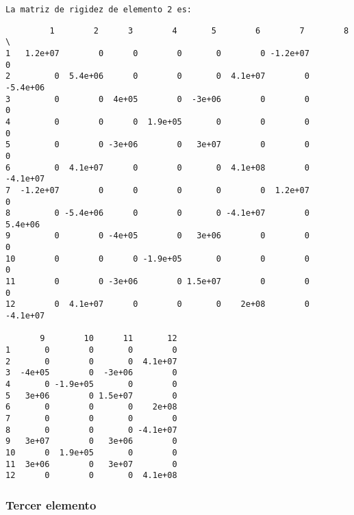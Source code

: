 \documentclass{article}
\begin{document}
    \begin{Verbatim}[commandchars=\\\{\}]
La matriz de rigidez de elemento 2 es:
    \end{Verbatim}

    
    \begin{verbatim}
         1        2      3        4       5        6        7        8   \
1   1.2e+07        0      0        0       0        0 -1.2e+07        0   
2         0  5.4e+06      0        0       0  4.1e+07        0 -5.4e+06   
3         0        0  4e+05        0  -3e+06        0        0        0   
4         0        0      0  1.9e+05       0        0        0        0   
5         0        0 -3e+06        0   3e+07        0        0        0   
6         0  4.1e+07      0        0       0  4.1e+08        0 -4.1e+07   
7  -1.2e+07        0      0        0       0        0  1.2e+07        0   
8         0 -5.4e+06      0        0       0 -4.1e+07        0  5.4e+06   
9         0        0 -4e+05        0   3e+06        0        0        0   
10        0        0      0 -1.9e+05       0        0        0        0   
11        0        0 -3e+06        0 1.5e+07        0        0        0   
12        0  4.1e+07      0        0       0    2e+08        0 -4.1e+07   

       9        10      11       12  
1       0        0       0        0  
2       0        0       0  4.1e+07  
3  -4e+05        0  -3e+06        0  
4       0 -1.9e+05       0        0  
5   3e+06        0 1.5e+07        0  
6       0        0       0    2e+08  
7       0        0       0        0  
8       0        0       0 -4.1e+07  
9   3e+07        0   3e+06        0  
10      0  1.9e+05       0        0  
11  3e+06        0   3e+07        0  
12      0        0       0  4.1e+08  
    \end{verbatim}

    
    \subsubsection{Tercer elemento}\label{tercer-elemento}
\end{document}
